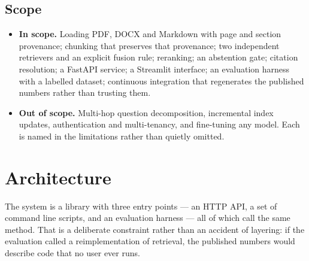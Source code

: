 \documentclass[11pt,a4paper]{article}
\begin{document}
\subsection{Scope}

\begin{itemize}[leftmargin=1.2em,itemsep=2pt]
  \item \textbf{In scope.} Loading PDF, DOCX and Markdown with page and section
        provenance; chunking that preserves that provenance; two independent
        retrievers and an explicit fusion rule; reranking; an abstention gate;
        citation resolution; a FastAPI service; a Streamlit interface; an
        evaluation harness with a labelled dataset; continuous integration that
        regenerates the published numbers rather than trusting them.
  \item \textbf{Out of scope.} Multi-hop question decomposition, incremental
        index updates, authentication and multi-tenancy, and fine-tuning any
        model. Each is named in the limitations rather than quietly omitted.
\end{itemize}

\section{Architecture}

The system is a library with three entry points --- an HTTP API, a set of command
line scripts, and an evaluation harness --- all of which call the same method.
That is a deliberate constraint rather than an accident of layering: if the
evaluation called a reimplementation of retrieval, the published numbers would
describe code that no user ever runs.
\end{document}
